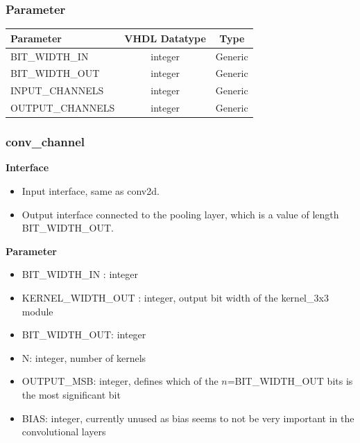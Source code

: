 \subsubsection{Parameter}

\begin{table}[hb]
	\centering
	\begin{tabular}{lcc}
		\toprule
		Parameter & VHDL Datatype & Type \\
		\midrule
		 BIT\_WIDTH\_IN & integer & Generic\\
		 BIT\_WIDTH\_OUT & integer & Generic \\
		 INPUT\_CHANNELS & integer & Generic\\
 	 	 OUTPUT\_CHANNELS & integer & Generic \\
		\bottomrule
	\end{tabular}
\end{table}




\subsubsection*{conv\_channel}


\textbf{Interface}
\begin{itemize}
	\item Input interface, same as conv2d.
	\item Output interface connected to the pooling layer, which is a value of length BIT\_WIDTH\_OUT.
\end{itemize}

\textbf{Parameter}
\begin{itemize}
 	\item BIT\_WIDTH\_IN : integer
 	\item KERNEL\_WIDTH\_OUT : integer, output bit width of the kernel\_3x3 module
 	\item BIT\_WIDTH\_OUT: integer
 	\item N: integer, number of kernels
 	\item OUTPUT\_MSB: integer, defines which of the $n$=BIT\_WIDTH\_OUT bits is the most significant bit
 	\item BIAS: integer, currently unused as bias seems to not be very important in the convolutional layers
\end{itemize}

